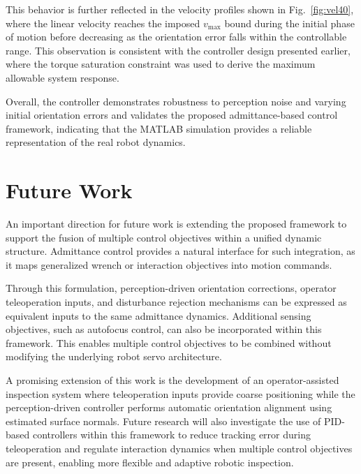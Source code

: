\documentclass[journal]{IEEEtran}
\begin{document}
This behavior is further reflected in the velocity profiles shown in Fig.~\ref{fig:vel40}, where the linear velocity reaches the imposed $v_{\max}$ bound during the initial phase of motion before decreasing as the orientation error falls within the controllable range. This observation is consistent with the controller design presented earlier, where the torque saturation constraint was used to derive the maximum allowable system response.

Overall, the controller demonstrates robustness to perception noise and varying initial orientation errors and validates the proposed admittance-based control framework, indicating that the MATLAB simulation provides a reliable representation of the real robot dynamics.

\section{Future Work}

An important direction for future work is extending the proposed framework to support the fusion of multiple control objectives within a unified dynamic structure. Admittance control provides a natural interface for such integration, as it maps generalized wrench or interaction objectives into motion commands.

Through this formulation, perception-driven orientation corrections, operator teleoperation inputs, and disturbance rejection mechanisms can be expressed as equivalent inputs to the same admittance dynamics. Additional sensing objectives, such as autofocus control, can also be incorporated within this framework. This enables multiple control objectives to be combined without modifying the underlying robot servo architecture.

A promising extension of this work is the development of an operator-assisted inspection system where teleoperation inputs provide coarse positioning while the perception-driven controller performs automatic orientation alignment using estimated surface normals. Future research will also investigate the use of PID-based controllers within this framework to reduce tracking error during teleoperation and regulate interaction dynamics when multiple control objectives are present, enabling more flexible and adaptive robotic inspection.
\end{document}
